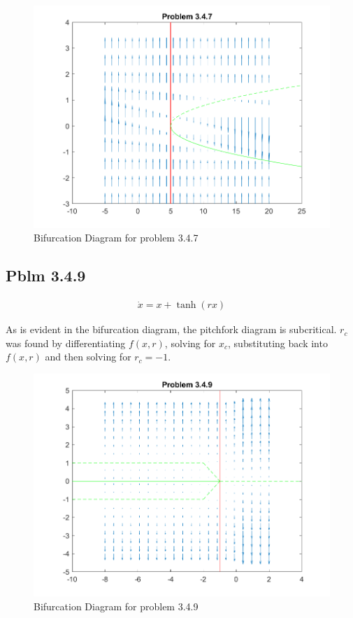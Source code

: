 \documentclass[letter]{article}
\begin{document}
\begin{figure}[h]
	\centering
	\includegraphics[width=\linewidth]{fig/pblm4_347}
	\caption{Bifurcation Diagram for problem 3.4.7}
	\label{fig:pblm4347}
\end{figure}

\newpage
\subsection{Pblm 3.4.9}

\begin{align*}
	\dot{x} = x + \tanh(rx)
\end{align*}

As is evident in the bifurcation diagram, the pitchfork diagram is subcritical. $r_c$ was found by differentiating $f(x,r)$, solving for $x_c$, substituting back into $f(x,r)$ and then solving for $r_c = -1$.


\begin{figure}[h]
	\centering
	\includegraphics[width=\linewidth]{fig/pblm4_349}
	\caption{Bifurcation Diagram for problem 3.4.9}
	\label{fig:pblm4349}
\end{figure}
\end{document}

